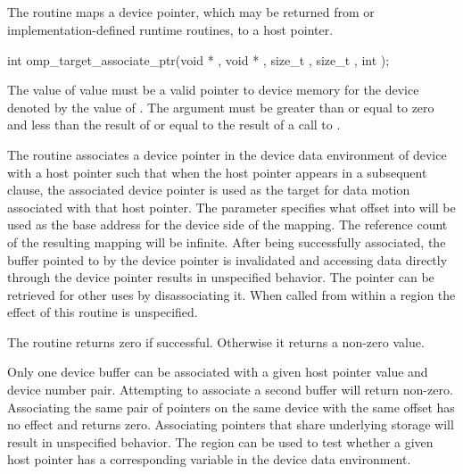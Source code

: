 \subsection{}
\label{subsec:omp_target_associate_ptr}
\summary

The  routine maps a device pointer, which may
be returned from  or implementation-defined runtime 
routines, to a host pointer.

\format
\begin{boxedcode}
int omp\_target\_associate\_ptr(void * , void * ,
                             size\_t , size\_t ,
                             int );
\end{boxedcode}

\pagebreak
{}
\constraints

The value of  value must be a valid pointer to device 
memory for the device denoted by the value of .
The  argument
must be greater than or equal to zero and less than the result of
 or equal to the result of a call to
.

\effect

The  routine associates a device pointer
in the device data environment of device 
with a host pointer such that when the host pointer appears in a subsequent
 clause, the associated device pointer is used as the target for
data motion associated with that host pointer.  The 
parameter specifies what offset into  will be used as the
base address for the device side of the mapping.  The reference count of the
resulting mapping will be infinite.  After being successfully associated, the
buffer pointed to by the device pointer is invalidated and accessing data
directly through the device pointer results in unspecified behavior.  The
pointer can be retrieved for other uses by disassociating it.
When called from within a  region 
the effect of this routine is unspecified.

The routine returns zero if successful. Otherwise it returns a non-zero value.

Only one device buffer can be associated with a given host pointer value and
device number pair. Attempting to associate a second buffer will return
non-zero. Associating the same pair of pointers on the same device with the
same offset has no effect and returns zero.  Associating pointers that share
underlying storage will result in unspecified behavior. The
 region can be used to test whether a given
host pointer has a corresponding variable in the device data environment.

